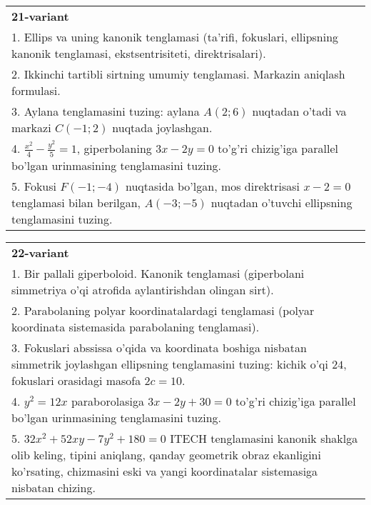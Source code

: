 \documentclass{article}
\begin{document}
\begin{tabular}{m{17cm}}
\textbf{21-variant}\\
1. Ellips va uning kanonik tenglamasi (ta'rifi, fokuslari, ellipsning kanonik tenglamasi, ekstsentrisiteti, direktrisalari).\\

2. Ikkinchi tartibli sirtning umumiy tenglamasi. Markazin aniqlash formulasi.\\

3. Aylana tenglamasini tuzing: aylana $A(2;6)$ nuqtadan o'tadi va markazi $C(-1;2)$ nuqtada joylashgan.\\

4. $\frac{x^{2}}{4} - \frac{y^{2}}{5} = 1$, giperbolaning $3x - 2y = 0$ to'g'ri chizig'iga parallel bo'lgan urinmasining tenglamasini tuzing.  \\

5. Fokusi $F( - 1; - 4)$ nuqtasida bo'lgan, mos direktrisasi $x - 2 = 0$ tenglamasi bilan berilgan, $A( - 3; - 5)$ nuqtadan o'tuvchi ellipsning tenglamasini tuzing.  
\end{tabular}
\vspace{1cm}


\begin{tabular}{m{17cm}}
\textbf{22-variant}\\
1. Bir pallali giperboloid. Kanonik tenglamasi (giperbolani simmetriya o'qi atrofida aylantirishdan olingan sirt).\\

2. Parabolaning polyar koordinatalardagi tenglamasi (polyar koordinata sistemasida parabolaning tenglamasi).\\

3. Fokuslari abssissa o'qida va koordinata boshiga nisbatan simmetrik joylashgan ellipsning tenglamasini tuzing: kichik o'qi $24$, fokuslari orasidagi masofa $2c=10$.\\

4. $y^{2} = 12x$ paraborolasiga $3x - 2y + 30 = 0$ to'g'ri chizig'iga parallel bo'lgan urinmasining tenglamasini tuzing.  \\

5. $32x^{2} + 52xy - 7y^{2} + 180 = 0$ ITECH tenglamasini kanonik shaklga olib keling, tipini aniqlang, qanday geometrik obraz ekanligini ko'rsating, chizmasini eski va yangi koordinatalar sistemasiga nisbatan chizing.  
\end{tabular}
\vspace{1cm}
\end{document}
